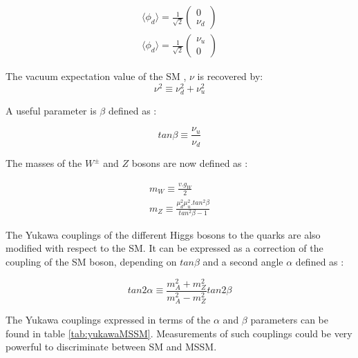\begin{multline}
    \langle \phi_d \rangle = \frac{1}{\sqrt{2}} \begin{pmatrix} 0 \\ \nu_d \end{pmatrix} \\
    \langle \phi_d \rangle = \frac{1}{\sqrt{2}} \begin{pmatrix} \nu_u \\ 0 \end{pmatrix}
\end{multline}

The vacuum expectation value of the SM , $\nu$ is recovered by:
\begin{equation}
    \nu^2 \equiv \nu_{d}^2 + \nu_{u}^2
\end{equation}

A useful parameter is $\beta$ defined as :

\begin{equation}
    tan \beta \equiv \frac{\nu_u}{\nu_d}
\end{equation}

The masses of the $W^{\pm}$ and $Z$ bosons are now defined as :

\begin{multline}
    m_W \equiv \frac{v.g_W}{2} \\
    m_Z \equiv \frac{\mu_{d}^2 \mu_{u}^2 . tan^2 \beta}{tan^2 \beta - 1}
\end{multline}

The Yukawa couplings of the different Higgs bosons to the quarks are also modified with respect to the SM. It can be expressed as a correction of the coupling of the SM boson, depending on $tan \beta$ and a second angle $\alpha$ defined as :

\begin{equation}
    tan 2\alpha \equiv \frac{m_{A}^2 + m_{Z}^2}{m_{A}^2 - m_{Z}^2} tan2\beta
\end{equation}

The Yukawa couplings expressed in terms of the $\alpha$ and $\beta$ parameters can be found in table \ref{tab:yukawaMSSM}. Measurements of such couplings could be very powerful to discriminate between SM and MSSM.

